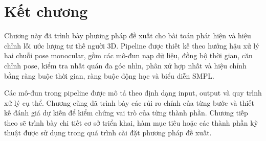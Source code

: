 \documentclass[../DoAn.tex]{subfiles}
\begin{document}
\section{Kết chương}
\label{sec:method_conclusion}

Chương này đã trình bày phương pháp đề xuất cho bài toán phát hiện và hiệu chỉnh lỗi ước lượng tư thế người 3D. Pipeline được thiết kế theo hướng hậu xử lý hai chuỗi pose monocular, gồm các mô-đun nạp dữ liệu, đồng bộ thời gian, căn chỉnh pose, kiểm tra nhất quán đa góc nhìn, phân xử hợp nhất và hiệu chỉnh bằng ràng buộc thời gian, ràng buộc động học và biểu diễn SMPL.

Các mô-đun trong pipeline được mô tả theo định dạng input, output và quy trình xử lý cụ thể. Chương cũng đã trình bày các rủi ro chính của từng bước và thiết kế đánh giá dự kiến để kiểm chứng vai trò của từng thành phần. Chương tiếp theo sẽ trình bày chi tiết cơ sở triển khai, hàm mục tiêu hoặc các thành phần kỹ thuật được sử dụng trong quá trình cài đặt phương pháp đề xuất.
\end{document}
